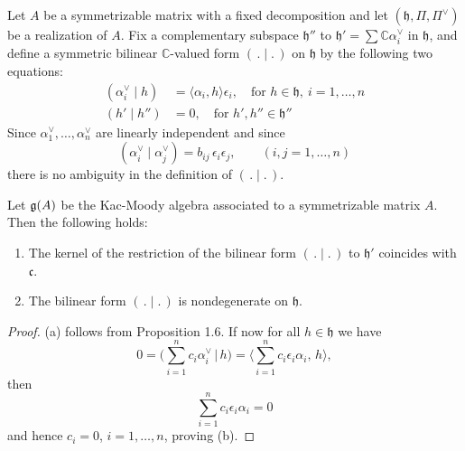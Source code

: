 \documentclass[12pt]{article}
\begin{document}
Let $A$ be a symmetrizable matrix with a fixed decomposition and let $(\mathfrak{h}, \Pi, \Pi^\vee)$ be a realization of $A$. Fix a complementary subspace $\mathfrak{h}''$ to $\mathfrak{h}' = \sum \mathbb{C}\alpha_i^\vee$ in $\mathfrak{h}$, and define a symmetric bilinear $\mathbb{C}$-valued form $(\,.\mid.\,)$ on $\mathfrak{h}$ by the following two equations:
\begin{align}
    (\alpha_i^\vee \mid h) & = \langle \alpha_i, h \rangle \epsilon_i, \quad \text{for } h \in \mathfrak{h},\ i = 1,\ldots,n \\
    (h' \mid h'')          & = 0, \quad \text{for } h', h'' \in \mathfrak{h}''
\end{align}
Since $\alpha_1^\vee, \ldots, \alpha_n^\vee$ are linearly independent and since \begin{equation}
    (\alpha_i^\vee \mid \alpha_j^\vee) = b_{ij}\,\epsilon_i\epsilon_j,
    \qquad (i,j=1,\ldots,n)
\end{equation}
there is no ambiguity in the definition of $(\,.\mid.\,)$.

\begin{lemma}\label{lem:bilinear-form-nondeg}
    Let $\mathfrak{g}(A)$ be the Kac-Moody algebra associated to a symmetrizable matrix $A$. Then the following holds:
    \begin{enumerate}
        \item The kernel of the restriction of the bilinear form $(\,.\mid.\,)$ to $\mathfrak{h}'$
              coincides with $\mathfrak{c}$.
        \item The bilinear form $(\,.\mid.\,)$ is nondegenerate on $\mathfrak{h}$.
    \end{enumerate}
\end{lemma}

\begin{proof}
    (a) follows from Proposition 1.6.
    If now for all $h \in \mathfrak{h}$ we have
    \[
        0 = \Big(\sum_{i=1}^n c_i \alpha_i^\vee \,\Big|\, h\Big)
        = \Big\langle \sum_{i=1}^n c_i \epsilon_i \alpha_i,\, h \Big\rangle,
    \]
    then
    \[
        \sum_{i=1}^n c_i \epsilon_i \alpha_i = 0
    \]
    and hence $c_i = 0$, $i=1,\ldots,n$, proving (b).
\end{proof}
\end{document}
